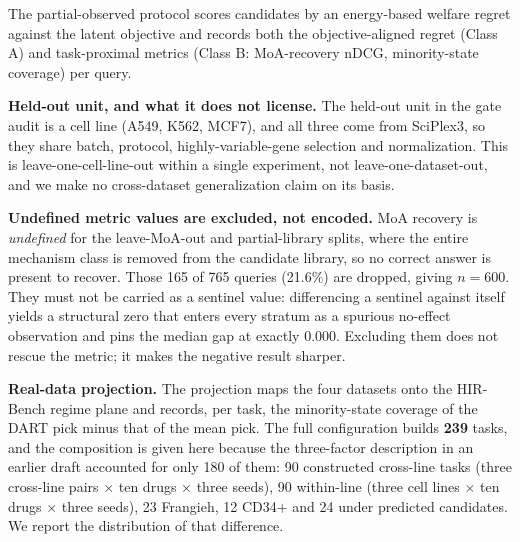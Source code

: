 \documentclass[11pt,letterpaper]{article}
\begin{document}
The partial-observed protocol scores candidates by an energy-based welfare regret against
the latent objective and records both the objective-aligned regret (Class A) and
task-proximal metrics (Class B: MoA-recovery nDCG\cite{nDCG}, minority-state coverage) per query.

\textbf{Held-out unit, and what it does not license.} The held-out unit in the gate audit
is a cell line (A549, K562, MCF7), and all three come from SciPlex3, so they share
batch, protocol, highly-variable-gene selection and normalization. This is
leave-one-cell-line-out within a single experiment, not leave-one-dataset-out, and we make
no cross-dataset generalization claim on its basis.

\textbf{Undefined metric values are excluded, not encoded.} MoA recovery is \emph{undefined}
for the leave-MoA-out and partial-library splits, where the entire mechanism class is removed
from the candidate library, so no correct answer is present to recover. Those 165 of 765
queries (21.6\%) are dropped, giving $n = 600$. They must not be carried as a sentinel value:
differencing a sentinel against itself yields a structural zero that enters every stratum as
a spurious no-effect observation and pins the median gap at exactly 0.000. Excluding them
does not rescue the metric; it makes the negative result sharper.

\textbf{Real-data projection.} The projection maps the four datasets onto the HIR-Bench
regime plane and records, per task, the minority-state coverage of the DART pick minus that
of the mean pick. The full configuration builds \textbf{239} tasks, and the composition is given here because the three-factor description in an earlier draft accounted for only 180 of them: 90 constructed cross-line tasks (three cross-line pairs $\times$ ten drugs $\times$ three seeds), 90 within-line (three cell lines $\times$ ten drugs $\times$ three seeds), 23 Frangieh, 12 CD34$+$ and 24 under predicted candidates. We report the distribution of that difference.
\end{document}
